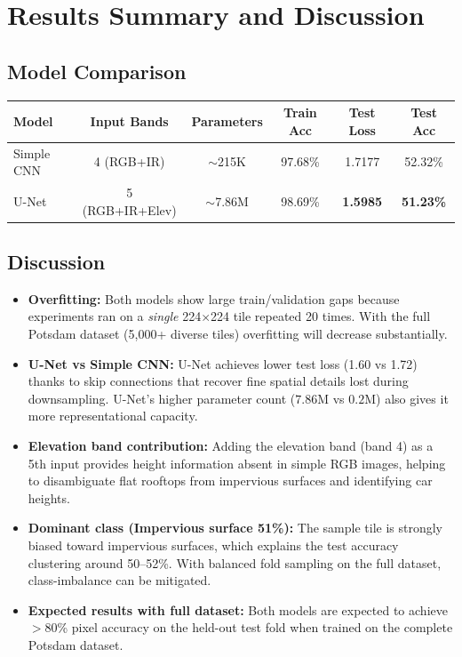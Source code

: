 \documentclass[12pt,a4paper]{article}
\begin{document}
\section{Results Summary and Discussion}

\subsection{Model Comparison}

\begin{center}
\begin{tabular}{l c c c c c}
\toprule
\textbf{Model} & \textbf{Input Bands} & \textbf{Parameters} & \textbf{Train Acc} & \textbf{Test Loss} & \textbf{Test Acc} \\
\midrule
Simple CNN  & 4 (RGB+IR) & $\sim$215K & 97.68\% & 1.7177 & 52.32\% \\
U-Net       & 5 (RGB+IR+Elev) & $\sim$7.86M & 98.69\% & \textbf{1.5985} & \textbf{51.23\%} \\
\bottomrule
\end{tabular}
\end{center}

\subsection{Discussion}

\begin{itemize}
    \item \textbf{Overfitting:} Both models show large train/validation gaps because experiments
          ran on a \emph{single} 224$\times$224 tile repeated 20 times.
          With the full Potsdam dataset (5{,}000+ diverse tiles) overfitting will decrease substantially.

    \item \textbf{U-Net vs Simple CNN:} U-Net achieves lower test loss (1.60 vs 1.72) thanks to
          skip connections that recover fine spatial details lost during downsampling.
          U-Net's higher parameter count ($7.86$M vs $0.2$M) also gives it more representational capacity.

    \item \textbf{Elevation band contribution:} Adding the elevation band (band 4) as a 5th input
          provides height information absent in simple RGB images, helping to disambiguate
          flat rooftops from impervious surfaces and identifying car heights.

    \item \textbf{Dominant class (Impervious surface 51\%):} The sample tile is strongly biased
          toward impervious surfaces, which explains the test accuracy clustering around 50--52\%.
          With balanced fold sampling on the full dataset, class-imbalance can be mitigated.

    \item \textbf{Expected results with full dataset:} Both models are expected to achieve
          $>$80\% pixel accuracy on the held-out test fold when trained on the complete Potsdam dataset.
\end{itemize}
\end{document}
